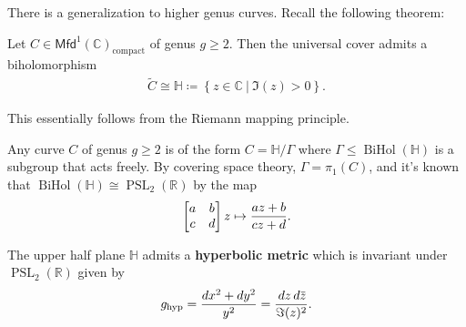 \begin{remark}

There is a generalization to higher genus curves. Recall the following
theorem:

\end{remark}

\begin{theorem}[Uniformization]

Let \(C \in {\mathsf{Mfd}}^1({\mathbb{C}})_{ \text{compact} }\) of genus
\(g\geq 2\). Then the universal cover admits a biholomorphism
\begin{align*}
\tilde C \cong {\mathbb{H}}\coloneqq\left\{{ z\in {\mathbb{C}}{~\mathrel{\Big|}~}\Im(z) > 0 }\right\}
.\end{align*}

\end{theorem}

\begin{remark}

This essentially follows from the Riemann mapping principle.

\end{remark}

\begin{corollary}[?]

Any curve \(C\) of genus \(g\geq 2\) is of the form
\(C = {\mathbb{H}}/ \Gamma\) where
\(\Gamma \leq \mathop{\mathrm{BiHol}}({\mathbb{H}})\) is a subgroup that
acts freely. By covering space theory, \(\Gamma = \pi_1(C)\), and it's
known that
\(\mathop{\mathrm{BiHol}}({\mathbb{H}}) \cong {\operatorname{PSL}}_2({\mathbb{R}})\)
by the map
\begin{align*}
\begin{bmatrix}
a & b 
\\
c & d
\end{bmatrix}
z
\mapsto 
{az + b \over cz + d}
.\end{align*}

\end{corollary}

\begin{proposition}[?]

The upper half plane \({\mathbb{H}}\) admits a \textbf{hyperbolic
metric} which is invariant under
\({\operatorname{PSL}}_2({\mathbb{R}})\) given by
\begin{align*}
g_{\text{hyp}} = {dx^2 + dy^2 \over y^2 } = {\,dz\,d\mkern 1.5mu\overline{\mkern-1.5muz\mkern-1.5mu}\mkern 1.5mu \over \Im(z)^2 }
.\end{align*}

\end{proposition}

